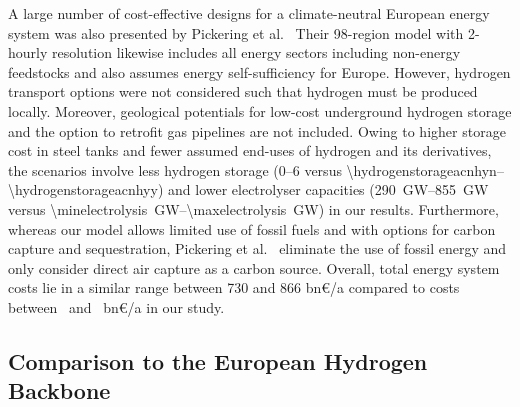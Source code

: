 A large number of cost-effective designs for a climate-neutral European energy
system was also presented by Pickering et
al.~\cite{pickeringDiversityOptions2022} Their 98-region model with 2-hourly
resolution likewise includes all energy sectors including non-energy feedstocks
and also assumes energy self-sufficiency for Europe. However, hydrogen transport
options were not considered such that hydrogen must be produced locally.
Moreover, geological potentials for low-cost underground hydrogen storage and
the option to retrofit gas pipelines are not included. Owing to higher storage
cost in steel tanks and fewer assumed end-uses of hydrogen and its derivatives,
the scenarios involve less hydrogen storage (\SIrange{0}{6}{\twh} versus
\SIrange{\hydrogenstorageacnhyn}{\hydrogenstorageacnhyy}{\twh}) and lower
electrolyser capacities (\SIrange{290}{855}{\giga\watt} versus
\SIrange{\minelectrolysis}{\maxelectrolysis}{\giga\watt}) in our results.
Furthermore, whereas our model allows limited use of fossil fuels and with
options for carbon capture and sequestration, Pickering et
al.~\cite{pickeringDiversityOptions2022} eliminate the use of fossil energy and
only consider direct air capture as a carbon source. Overall, total energy
system costs lie in a similar range between 730 and 866 bn\euro/a compared to
costs between \minsystemcost~and \maxsystemcost~bn\euro/a in our study.

\subsection*{Comparison to the European Hydrogen Backbone}

